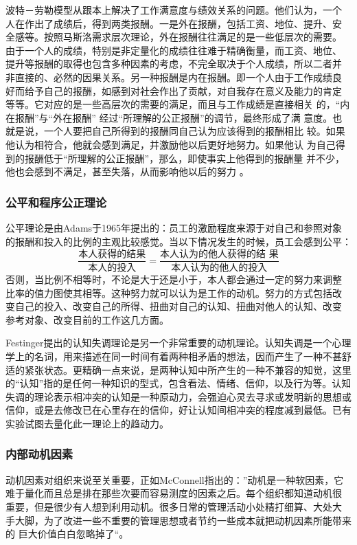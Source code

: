 \documentclass[12pt,a4paper,cs4size]{ctexart}
\begin{document}
波特－劳勒模型从跟本上解决了工作满意度与绩效关系的问题。他们认为，一个
人在作出了成绩后，得到两类报酬。一是外在报酬，包括工资、地位、提升、安
全感等。按照马斯洛需求层次理论，外在报酬往往满足的是一些低层次的需要。
由于一个人的成绩，特别是非定量化的成绩往往难于精确衡量，而工资、地位、
提升等报酬的取得也包含多种因素的考虑，不完全取决于个人成绩，所以二者并
非直接的、必然的因果关系。另一种报酬是内在报酬。即一个人由于工作成绩良
好而给予自己的报酬，如感到对社会作出了贡献，对自我存在意义及能力的肯定
等等。它对应的是一些高层次的需要的满足，而且与工作成绩是直接相关
的，“内在报酬”与“外在报酬” 经过“所理解的公正报酬”的调节，最终形成了满
意度。也就是说，一个人要把自己所得到的报酬同自己认为应该得到的报酬相比
较。如果他认为相符合，他就会感到满足，并激励他以后更好地努力。如果他认
为自己得到的报酬低于“所理解的公正报酬”，那么，即使事实上他得到的报酬量
并不少，他也会感到不满足，甚至失落，从而影响他以后的努力
\cite{porter1968maa}。 

\subsubsection{公平和程序公正理论}
公平理论是由Adams于1965年提出的：员工的激励程度来源于对自己和参照对象
的报酬和投入的比例的主观比较感觉。当以下情况发生的时候，员工会感到公平：
$$\frac{\text{本人获得的结果}}{\text{本人的投入}} = \frac{\text{本人认为的他人获得的结
  果}}{\text{本人认为的他人的投入}}$$
否则，当比例不相等时，不论是大于还是小于，本人都会通过一定的努力来调整
比率的值力图使其相等。这种努力就可以认为是工作的动机。努力的方式包括改
变自己的投入、改变自己的所得、扭曲对自己的认知、扭曲对他人的认知、改变
参考对象、改变目前的工作这几方面\cite{adams1965ise}。

Festinger提出的认知失调理论是另一个非常重要的动机理论。认知失调是一个心理学上的名词，用来描述在同一时间有着两种相矛盾的想法，因而产生了一种不甚舒适的紧张状态。更精确一点来说，是两种认知中所产生的一种不兼容的知觉，这里的“认知”指的是任何一种知识的型式，包含看法、情绪、信仰，以及行为等。认知失调的理论表示相冲突的认知是一种原动力，会强迫心灵去寻求或发明新的思想或信仰，或是去修改已在心里存在的信仰，好让认知间相冲突的程度减到最低。已有实验试图去量化此一理论上的趋动力\cite{aronson1969tcd}。

\subsubsection{内部动机因素}
动机因素对组织来说至关重要，正如McConnell指出的：”动机是一种软因素，它
难于量化而且总是排在那些次要而容易测度的因素之后。每个组织都知道动机很
重要，但是很少有人想到利用动机。很多日常的管理活动小处精打细算、大处大
手大脚，为了改进一些不重要的管理思想或者节约一些成本就把动机因素所能带来的
巨大价值白白忽略掉了“\cite{663801}。
\end{document}
